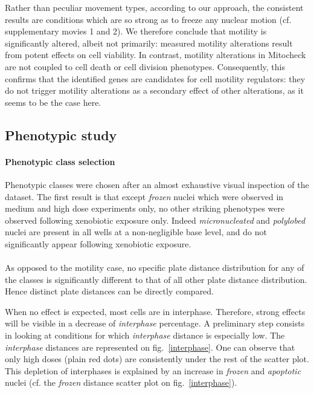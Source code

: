 Rather than peculiar movement types, according to our approach, the
consistent results are conditions which are so strong as to freeze any
nuclear motion (cf. supplementary movies 1 and 2). We therefore
conclude that motility is significantly altered, albeit not primarily:
measured motility alterations result from potent effects on cell
viability. In contrast, motility alterations in Mitocheck are not coupled to cell
death or cell division phenotypes. Consequently, this confirms that
the identified genes are candidates for cell motility regulators: they do not
trigger motility alterations as a secondary effect of other
alterations, as it seems to be the case here. 

\subsection{Phenotypic study}
\paragraph{Phenotypic class selection}
Phenotypic classes were chosen after an almost exhaustive visual
inspection of the dataset. The first result is that except
\textit{frozen} nuclei which were observed in medium and high dose
experiments only, no other striking phenotypes were observed following
xenobiotic exposure only. Indeed \textit{micronucleated} and
\textit{polylobed} nuclei are present in all wells at a non-negligible
base level, and do not significantly appear following xenobiotic
exposure. 

\paragraph*{}
As opposed to the motility case, no specific plate distance distribution for any of the classes is significantly different to that of all other plate distance distribution. Hence distinct plate distances can be directly compared. 

When no effect is expected, most cells are in interphase. Therefore, strong effects will be visible in a decrease of \textit{interphase} percentage. A preliminary step consists in looking at conditions for which \textit{interphase} distance is especially low. The \textit{interphase} distances are represented on fig.~\ref{interphase}. One can observe that only high doses (plain red dots) are consistently under the rest of the scatter plot. This depletion of interphases is explained by an increase in \textit{frozen} and \textit{apoptotic} nuclei (cf. the \textit{frozen} distance scatter plot on fig.~\ref{interphase}).

